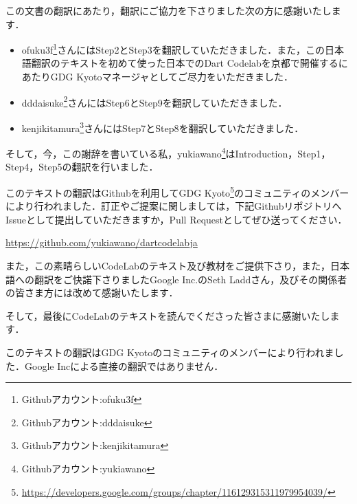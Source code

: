 
この文書の翻訳にあたり，翻訳にご協力を下さりました次の方に感謝いたします．

\begin{itemize}
\item ofuku3f\footnote{Githubアカウント:ofuku3f}さんにはStep2とStep3を翻訳していただきました．また，この日本語翻訳のテキストを初めて使った日本でのDart Codelabを京都で開催するにあたりGDG Kyotoマネージャとしてご尽力をいただきました．
\item dddaisuke\footnote{Githubアカウント:dddaisuke}さんにはStep6とStep9を翻訳していただきました．
\item kenjikitamura\footnote{Githubアカウント:kenjikitamura}さんにはStep7とStep8を翻訳していただきました．
\end{itemize}

そして，今，この謝辞を書いている私，yukiawano\footnote{Githubアカウント:yukiawano}はIntroduction，Step1，Step4，Step5の翻訳を行いました．

このテキストの翻訳はGithubを利用してGDG Kyoto\footnote{\url{https://developers.google.com/groups/chapter/116129315311979954039/}}のコミュニティのメンバーにより行われました．訂正やご提案に関しましては，下記GithubリポジトリへIssueとして提出していただきますか，Pull Requestとしてぜひ送ってください．

\vspace{5mm}
\url{https://github.com/yukiawano/dartcodelabja}
\vspace{5mm}

また，この素晴らしいCodeLabのテキスト及び教材をご提供下さり，また，日本語への翻訳をご快諾下さりましたGoogle Inc.のSeth Laddさん，及びその関係者の皆さま方には改めて感謝いたします．

そして，最後にCodeLabのテキストを読んでくださった皆さまに感謝いたします．


このテキストの翻訳はGDG Kyotoのコミュニティのメンバーにより行われました．Google Incによる直接の翻訳ではありません．


